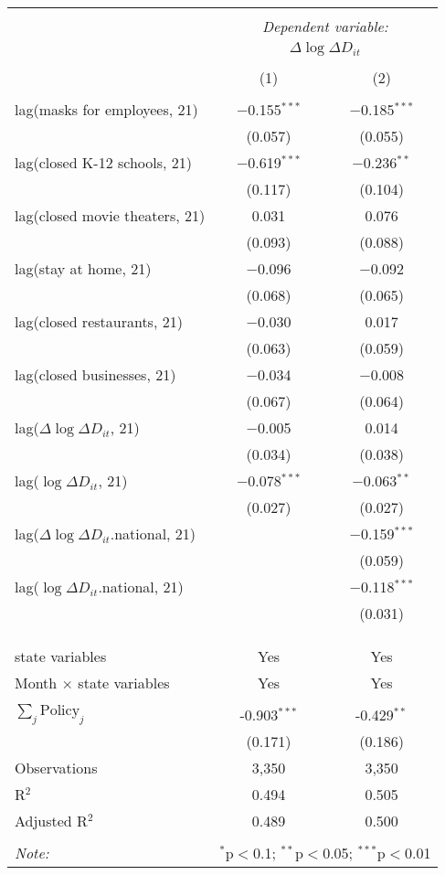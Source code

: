 \begin{tabular}{@{\extracolsep{1pt}}lcc} 
\\[-1.8ex]\hline 
\hline \\[-1.8ex] 
 & \multicolumn{2}{c}{\textit{Dependent variable:}} \\ 
\cline{2-3} 
 & \multicolumn{2}{c}{$\Delta \log \Delta D_{it}$} \\ 
\\[-1.8ex] & (1) & (2)\\ 
\hline \\[-1.8ex] 
 lag(masks for employees, 21) & $-$0.155$^{***}$ & $-$0.185$^{***}$ \\ 
  & (0.057) & (0.055) \\ 
  lag(closed K-12 schools, 21) & $-$0.619$^{***}$ & $-$0.236$^{**}$ \\ 
  & (0.117) & (0.104) \\ 
  lag(closed movie theaters, 21) & 0.031 & 0.076 \\ 
  & (0.093) & (0.088) \\ 
  lag(stay at home, 21) & $-$0.096 & $-$0.092 \\ 
  & (0.068) & (0.065) \\ 
  lag(closed restaurants, 21) & $-$0.030 & 0.017 \\ 
  & (0.063) & (0.059) \\ 
  lag(closed businesses, 21) & $-$0.034 & $-$0.008 \\ 
  & (0.067) & (0.064) \\ 
  lag($\Delta \log \Delta D_{it}$, 21) & $-$0.005 & 0.014 \\ 
  & (0.034) & (0.038) \\ 
  lag($\log \Delta D_{it}$, 21) & $-$0.078$^{***}$ & $-$0.063$^{**}$ \\ 
  & (0.027) & (0.027) \\ 
  lag($\Delta \log \Delta D_{it}$.national, 21) &  & $-$0.159$^{***}$ \\ 
  &  & (0.059) \\ 
  lag($\log \Delta D_{it}$.national, 21) &  & $-$0.118$^{***}$ \\ 
  &  & (0.031) \\ 
   &  &  \\ 
  &  &  \\ 
 \hline \\[-1.8ex] 
state variables & Yes & Yes \\ 
Month $\times$ state variables & Yes & Yes \\ 
\hline \\[-1.8ex] 
$\sum_j \mathrm{Policy}_j$ & -0.903$^{***}$ & -0.429$^{**}$ \\ 
 & (0.171) & (0.186) \\ 
Observations & 3,350 & 3,350 \\ 
R$^{2}$ & 0.494 & 0.505 \\ 
Adjusted R$^{2}$ & 0.489 & 0.500 \\ 
\hline 
\hline \\[-1.8ex] 
\textit{Note:}  & \multicolumn{2}{r}{$^{*}$p$<$0.1; $^{**}$p$<$0.05; $^{***}$p$<$0.01} \\ 
\end{tabular} 
